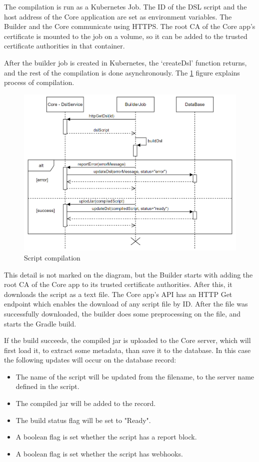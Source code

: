 The compilation is run as a Kubernetes Job. The ID of the DSL script and the host address of the Core application are set as environment variables. The Builder and the Core communicate using HTTPS. The root CA of the Core app's certificate is mounted to the job on a volume, so it can be added to the trusted certificate authorities in that container. 

After the builder job is created in Kubernetes, the `createDsl' function returns, and the rest of the compilation is done asynchronously. The \ref{fig:seq2} figure explains process of compilation.

\begin{figure}[h]
    \centering
    \includegraphics[width=130mm, keepaspectratio]{seq2.png}
    \caption{Script compilation}
    \label{fig:seq2}
\end{figure}

This detail is not marked on the diagram, but the Builder starts with adding the root CA of the Core app to its trusted certificate authorities. After this, it downloads the script as a text file. The Core app's API has an HTTP Get endpoint which enables the download of any script file by ID. After the file was successfully downloaded, the builder does some preprocessing on the file, and starts the Gradle build. 

If the build succeeds, the compiled jar is uploaded to the Core server, which will first load it, to extract some metadata, than save it to the database. In this case the following updates will occur on the database record:

\begin{itemize}
    \item The name of the script will be updated from the filename, to the server name defined in the script.
    \item The compiled jar will be added to the record.
    \item The build status flag will be set to "Ready".
    \item A boolean flag is set whether the script has a report block.
    \item A boolean flag is set whether the script has webhooks.
\end{itemize}


